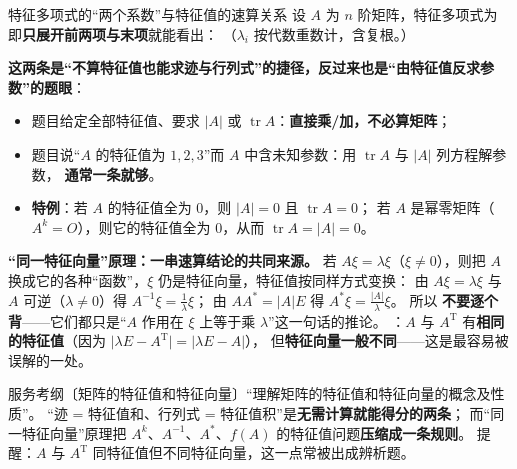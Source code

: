 \begin{fdeep}{特征多项式的“两个系数”与特征值的速算关系}
设 $A$ 为 $n$ 阶矩阵，特征多项式为
即\textbf{只展开前两项与末项}就能看出：
（$\lambda_i$ 按代数重数计，含复根。）

\textbf{这两条是“不算特征值也能求迹与行列式”的捷径，反过来也是“由特征值反求参数”的题眼}：
\begin{itemize}[leftmargin=2.2em,itemsep=0.22em]
\item 题目给定全部特征值、要求 $\lvert A\rvert$ 或 $\operatorname{tr}A$：\textbf{直接乘/加，不必算矩阵}；
\item 题目说“$A$ 的特征值为 $1,2,3$”而 $A$ 中含未知参数：用 $\operatorname{tr}A$ 与 $\lvert A\rvert$ 列方程解参数，
      \textbf{通常一条就够}。
\item \textbf{特例}：若 $A$ 的特征值全为 $0$，则 $\lvert A\rvert=0$ 且 $\operatorname{tr}A=0$；
      若 $A$ 是幂零矩阵（$A^{k}=O$），则它的特征值全为 $0$，从而 $\operatorname{tr}A=\lvert A\rvert=0$。
\end{itemize}

\medskip
\textbf{“同一特征向量”原理：一串速算结论的共同来源。}
若 $A\xi=\lambda\xi$（$\xi\ne0$），则把 $A$ 换成它的各种“函数”，$\xi$ 仍是特征向量，特征值按同样方式变换：
由 $A\xi=\lambda\xi$ 与 $A$ 可逆（$\lambda\ne0$）得 $A^{-1}\xi=\tfrac1\lambda\xi$；
由 $AA^{*}=\lvert A\rvert E$ 得 $A^{*}\xi=\tfrac{\lvert A\rvert}{\lambda}\xi$。
所以
\textbf{不要逐个背}——它们都只是“$A$ 作用在 $\xi$ 上等于乘 $\lambda$”这一句话的推论。
：$A$ 与 $A^{\mathrm T}$ 有\textbf{相同的特征值}（因为 $\lvert\lambda E-A^{\mathrm T}\rvert=\lvert\lambda E-A\rvert$），
但\textbf{特征向量一般不同}——这是最容易被误解的一处。

\fbref{}服务考纲〔矩阵的特征值和特征向量〕“理解矩阵的特征值和特征向量的概念及性质”。
“迹 = 特征值和、行列式 = 特征值积”是\textbf{无需计算就能得分的两条}；
而“同一特征向量”原理把 $A^{k}$、$A^{-1}$、$A^{*}$、$f(A)$ 的特征值问题\textbf{压缩成一条规则}。
提醒：$A$ 与 $A^{\mathrm T}$ 同特征值但不同特征向量，这一点常被出成辨析题。
\end{fdeep}

